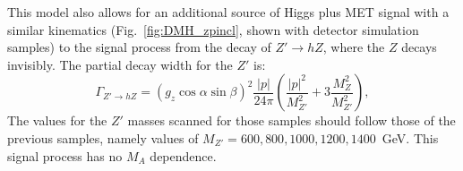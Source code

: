  This model also allows for an additional source of Higgs plus MET signal with a similar kinematics (Fig.~\ref{fig:DMH_zpincl}, shown with detector simulation 
 samples) to the signal process from the decay of $Z' \to h Z$, where the $Z$ decays invisibly. The partial decay width for the $Z'$ is:
 \begin{equation}
 \Gamma_{Z' \to hZ}  = (g_z \cos \alpha \sin \beta)^2 \frac{|p|}{24 \pi} \left( \frac{ |p|^2 }{M_{Z'}^2} + 3 \frac{M_Z^2}{M_{Z'}^2} \right),
 \end{equation}
The values for the $Z'$ masses scanned for those samples should follow those of the previous samples, 
namely values of $M_{Z'}=600, 800, 1000, 1200, 1400$~GeV.  This signal process has no $M_A$ dependence. 
 
\begin{figure}[h!]
  	\centering
  	\hfill
  	\hfill
\end{figure}
